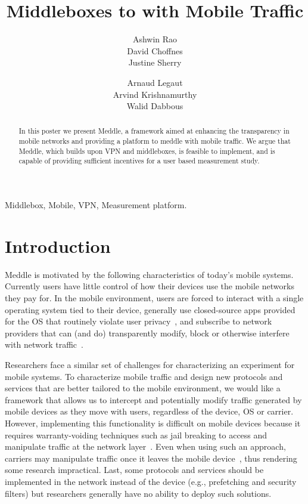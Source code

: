 \documentclass{sig-alternate-10pt}
\title{Middleboxes to \meddle with Mobile Traffic}
\author{
\alignauthor
Ashwin Rao\\
\affaddr{INRIA}
\alignauthor        
David Choffnes\\
\affaddr{University of Washington}
\alignauthor
Justine Sherry\\
\affaddr{UC Berkeley}
\and
\alignauthor
Arnaud Legaut\\
\affaddr{INRIA}
\alignauthor 
Arvind Krishnamurthy\\
\affaddr{University of Washington}
\alignauthor
Walid Dabbous\\
\affaddr{INRIA}
}
\date{}
\newcommand{\meddle}{{Meddle}\xspace}
\begin{document}
	
\maketitle

\begin{abstract}
In this poster we present \meddle, a framework aimed at enhancing
the transparency in mobile networks and providing a platform to
meddle with mobile traffic. We argue that \meddle, which builds upon
VPN and middleboxes, is feasible to implement, and is capable of
providing sufficient incentives for a user based measurement study.   
\end{abstract}

\begin{keywords}
Middlebox, Mobile, VPN, Measurement platform.
\end{keywords}

\section{Introduction}

\meddle is motivated by the following characteristics of today's
mobile systems. Currently users have little control of how their
devices use the mobile networks they pay for. In the mobile
environment, users are forced to interact with a single operating
system tied to their device, generally use closed-source apps provided
for the OS that routinely violate user
privacy~\cite{hornyack:appfence}, and subscribe to network providers
that can (and do) transparently modify, block or otherwise interfere
with network traffic~\cite{wang:middleboxes}.

Researchers face a similar set of challenges for characterizing an
experiment for mobile systems. To characterize mobile traffic and
design new protocols and services that are better tailored to the
mobile environment, we would like a framework that allows us to
intercept and potentially modify traffic generated by mobile devices
as they move with users, regardless of the device, OS or
carrier. However, implementing this functionality is difficult on
mobile devices because it requires warranty-voiding techniques such as
jail breaking to access and manipulate traffic at the network
layer~\cite{enck:taintdroid}. Even when using such an approach,
carriers may manipulate traffic once it leaves the mobile
device~\cite{wang:middleboxes}, thus rendering some research
impractical. Last, some protocols and services should be implemented
in the network instead of the device (e.g., prefetching and security
filters) but researchers generally have no ability to deploy such
solutions.
\end{document}
